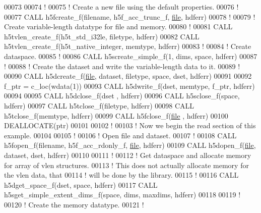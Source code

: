 \begin{DoxyCode}
00073 
00074   \textcolor{comment}{!}
00075   \textcolor{comment}{! Create a new file using the default properties.}
00076   \textcolor{comment}{!}
00077   \textcolor{keyword}{CALL }h5fcreate\_f(filename, h5f\_acc\_trunc\_f, \hyperlink{structfile}{file}, hdferr)
00078   \textcolor{comment}{!}
00079   \textcolor{comment}{! Create variable-length datatype for file and memory.}
00080   \textcolor{comment}{!}
00081   \textcolor{keyword}{CALL }h5tvlen\_create\_f(h5t\_std\_i32le, filetype, hdferr)
00082   \textcolor{keyword}{CALL }h5tvlen\_create\_f(h5t\_native\_integer, memtype, hdferr)
00083   \textcolor{comment}{!}
00084   \textcolor{comment}{! Create dataspace.}
00085   \textcolor{comment}{!}
00086   \textcolor{keyword}{CALL }h5screate\_simple\_f(1, dims, space, hdferr)
00087   \textcolor{comment}{!}
00088   \textcolor{comment}{! Create the dataset and write the variable-length data to it.}
00089   \textcolor{comment}{!}
00090   \textcolor{keyword}{CALL }h5dcreate\_f(\hyperlink{structfile}{file}, dataset, filetype, space, dset, hdferr)
00091  
00092   f\_ptr = c\_loc(wdata(1))
00093   \textcolor{keyword}{CALL }h5dwrite\_f(dset, memtype, f\_ptr, hdferr)
00094 
00095   \textcolor{keyword}{CALL }h5dclose\_f(dset , hdferr)
00096   \textcolor{keyword}{CALL }h5sclose\_f(space, hdferr)
00097   \textcolor{keyword}{CALL }h5tclose\_f(filetype, hdferr)
00098   \textcolor{keyword}{CALL }h5tclose\_f(memtype, hdferr)
00099   \textcolor{keyword}{CALL }h5fclose\_f(\hyperlink{structfile}{file} , hdferr)
00100   \textcolor{keyword}{DEALLOCATE}(ptr)
00101 
00102   \textcolor{comment}{!}
00103   \textcolor{comment}{! Now we begin the read section of this example.}
00104 
00105   \textcolor{comment}{!}
00106   \textcolor{comment}{! Open file and dataset.}
00107   \textcolor{comment}{!}
00108   \textcolor{keyword}{CALL }h5fopen\_f(filename, h5f\_acc\_rdonly\_f, \hyperlink{structfile}{file}, hdferr)
00109   \textcolor{keyword}{CALL }h5dopen\_f(\hyperlink{structfile}{file}, dataset, dset, hdferr)
00110 
00111   \textcolor{comment}{!}
00112   \textcolor{comment}{! Get dataspace and allocate memory for array of vlen structures.}
00113   \textcolor{comment}{! This does not actually allocate memory for the vlen data, that}
00114   \textcolor{comment}{! will be done by the library.}
00115   \textcolor{comment}{!}
00116   \textcolor{keyword}{CALL }h5dget\_space\_f(dset, space, hdferr)
00117   \textcolor{keyword}{CALL }h5sget\_simple\_extent\_dims\_f(space, dims, maxdims, hdferr) 
00118 
00119   \textcolor{comment}{!}
00120   \textcolor{comment}{! Create the memory datatype.}
00121   \textcolor{comment}{!}

\end{DoxyCode}
